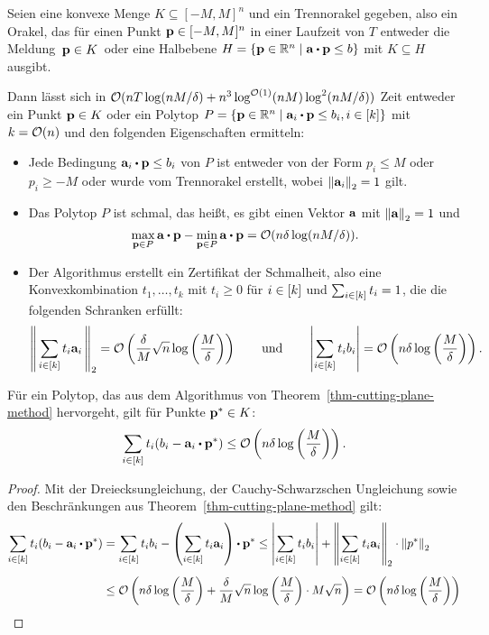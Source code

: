 \begin{theorem}\label{thm-cutting-plane-method}
	Seien eine konvexe Menge $K\subseteq [-M,M]^n$ und ein Trennorakel gegeben, also ein Orakel, das für einen Punkt $\mathbf{p}\in[-M,M]^n$ in einer Laufzeit von $T$ entweder die Meldung \glqq\,$\mathbf{p}\in K$\grqq\ oder eine Halbebene $H=\{ \fp \in\R^n \mid \fa \bcdot \fp \leq b \}$ mit $K\subseteq H$ ausgibt.
	
	Dann lässt sich in $\mathcal{O}(nT\log(nM/\delta) + n^3 \log^{\mathcal{O}(1)}(nM)\log^2(nM/\delta))$ Zeit entweder ein Punkt $\mathbf{p}\in K$ oder ein Polytop $P=\{ \fp\in\R^n \mid \fa_i \bcdot \fp \leq b_i, i\in\first{k} \}$ mit $k=\mathcal{O}(n)$ und den folgenden Eigenschaften ermitteln:
	\begin{itemize}
		\item Jede Bedingung $\fa_i \bcdot \fp \leq b_i$ von $P$ ist entweder von der Form $p_i \leq M$ oder $p_i\geq -M$ oder wurde vom Trennorakel erstellt, wobei $\left\lVert \mathbf{a}_i \right\rVert_2=1$ gilt.
		\item Das Polytop $P$ ist schmal, das heißt, es gibt einen Vektor $\mathbf{a}$ mit $\left\lVert \mathbf{a} \right\rVert_2=1$ und 
	\[
	\max_{\fp\in P} \fa \bcdot \fp - \min_{\fp\in P} \fa \bcdot \fp = \bigO(n\delta \log(nM/\delta)).
	\]
		\item Der Algorithmus erstellt ein Zertifikat der Schmalheit, also eine Konvexkombination $t_1,\dots,t_k$ mit $t_i\geq0$ für $i\in\left[ k \right]$ und $\sum_{i\in\left[ k \right]}t_i = 1$, die die folgenden Schranken erfüllt:
		\[
		\left\lVert \, \sum_{i\in\left[ k \right]} t_i \mathbf{a}_i \,  \right\rVert_2 = \mathcal{O}\left( \frac{\delta}{M} \sqrt{n} \log\left( \frac{M}{\delta} \right) \right)
		\qquad
		\text{und}
		\qquad
		\left\lvert \sum_{i\in\left[ k \right]} t_i b_i \right\rvert = \mathcal{O}\left(n\delta\log\left(\frac{M}{\delta}\right) \right).
		\]
	\end{itemize}
\end{theorem}

\begin{proposition}\label{prop-trivial-bound-thm}
	Für ein Polytop, das aus dem Algorithmus von Theorem~\ref{thm-cutting-plane-method} hervorgeht, gilt für Punkte $\mathbf{p}^*\in K$:
	\[
		\sum_{i\in\first{k}} t_i (b_i - \fa_i \bcdot \fp^*) \leq \bigO\left( n\delta\log\left(\frac{M}{\delta}\right) \right).
	\]
\end{proposition}
\begin{proof}
	Mit der Dreiecksungleichung, der Cauchy-Schwarzschen Ungleichung sowie den Beschränkungen aus Theorem~\ref{thm-cutting-plane-method} gilt:
	\begin{align*}
	\sum_{i\in\first{k}}  t_i (b_i - \fa_i \bcdot \fp^*)
	&= \sum_{i\in\first{k}} t_i b_i
	- \left( \sum_{i\in\first{k}} t_i \fa_i \right)\bcdot \fp^*
	\leq
	\abs{\sum_{i\in\first{k}} t_i b_i}
	+ \norm{\sum_{i\in\first{k}} t_i \fa_i} \cdot \norm{p^*}
	\\[5pt]
	&\leq \bigO\left( 
	n\delta \log\left(\frac{M}{\delta}\right)
	+ \frac{\delta}{M}\sqrt{n}\log\left( \frac{M}{\delta} \right)
	\cdot M \sqrt{n}
	\right)
	= \bigO\left(
	n\delta\log\left( \frac{M}{\delta} \right)
	\right)
	\end{align*}
\end{proof}

